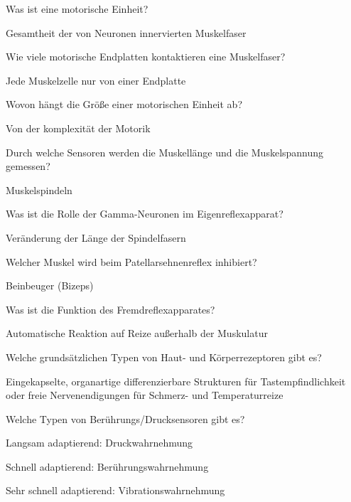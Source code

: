 \documentclass[10pt, a4paper]{exam}
\begin{document}
\begin{questions}
  \question Was ist eine motorische Einheit?
  \begin{solution}
    Gesamtheit der von Neuronen innervierten Muskelfaser
  \end{solution}

  \question Wie viele motorische Endplatten kontaktieren eine Muskelfaser?
  \begin{solution}
    Jede Muskelzelle nur von einer Endplatte
  \end{solution}

  \question Wovon hängt die Größe einer motorischen Einheit ab?
  \begin{solution}
    Von der komplexität der Motorik
  \end{solution}

  \question Durch welche Sensoren werden die Muskellänge und die Muskelspannung gemessen?
  \begin{solution}
    Muskelspindeln
  \end{solution}

  \question Was ist die Rolle der Gamma-Neuronen im Eigenreflexapparat?
  \begin{solution}
    Veränderung der Länge der Spindelfasern
  \end{solution}

  \question Welcher Muskel wird beim Patellarsehnenreflex inhibiert?
  \begin{solution}
    Beinbeuger (Bizeps)
  \end{solution}

  \question Was ist die Funktion des Fremdreflexapparates?
  \begin{solution}
    Automatische Reaktion auf Reize außerhalb der Muskulatur
  \end{solution}

  \question Welche grundsätzlichen Typen von Haut- und Körperrezeptoren gibt es?
  \begin{solution}
    Eingekapselte, organartige differenzierbare Strukturen für Tastempfindlichkeit oder freie Nervenendigungen für Schmerz- und Temperaturreize
  \end{solution}

  \question Welche Typen von Berührungs/Drucksensoren gibt es?
  \begin{solution}
    \begin{itemize*}
      \item Langsam adaptierend: Druckwahrnehmung
      \item Schnell adaptierend: Berührungswahrnehmung
      \item Sehr schnell adaptierend: Vibrationswahrnehmung
    \end{itemize*}
  \end{solution}


\end{questions}
\end{document}
